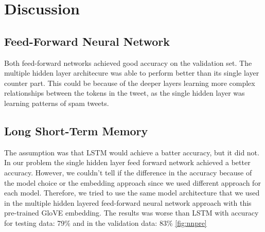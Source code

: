\section{Discussion}
\label{sec:discussion}


\subsection{Feed-Forward Neural Network} Both feed-forward networks
achieved good accuracy on the validation set. The multiple hidden
layer architecure was able to perform better than its single layer
counter part. This could be because of the deeper layers learning more
complex relationships between the tokens in the tweet, as the single
hidden layer was learning patterns of spam tweets.

\subsection{Long Short-Term Memory }
The assumption was that LSTM would achieve a batter accuracy, but it did not. In our problem the single hidden layer feed forward network achieved a better accuracy. However, we couldn’t tell if the difference in the accuracy because of the model choice or the embedding approach since we used different approach for each model. Therefore, we tried to use the same model architecture that we used in the multiple hidden layered feed-forward neural network approach with this pre-trained GloVE embedding. The results was worse than LSTM with accuracy for testing data: 79\% and in the validation data: 83\%  \cref{fig:nnpre}

